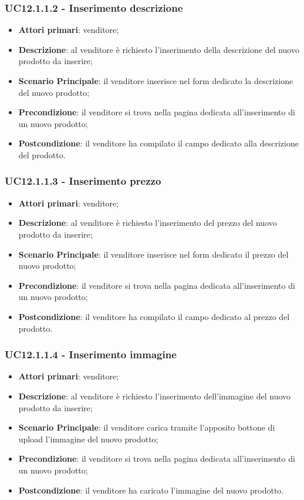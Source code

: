 \subsubsection{UC12.1.1.2 - Inserimento descrizione}
\begin{itemize}
\item \textbf{Attori primari}: venditore;
\item \textbf{Descrizione}: al venditore è richiesto l'inserimento della descrizione del nuovo prodotto da inserire;
\item \textbf{Scenario Principale}: il venditore inserisce nel form dedicato la descrizione del nuovo prodotto;
\item \textbf{Precondizione}: il venditore si trova nella pagina dedicata all'inserimento di un nuovo prodotto;
\item \textbf{Postcondizione}: il venditore ha compilato il campo dedicato alla descrizione del prodotto.
\end{itemize}

\subsubsection{UC12.1.1.3 - Inserimento prezzo}
\begin{itemize}
\item \textbf{Attori primari}: venditore;
\item \textbf{Descrizione}: al venditore è richiesto l'inserimento del prezzo del nuovo prodotto da inserire;
\item \textbf{Scenario Principale}: il venditore inserisce nel form dedicato il prezzo del nuovo prodotto;
\item \textbf{Precondizione}: il venditore si trova nella pagina dedicata all'inserimento di un nuovo prodotto;
\item \textbf{Postcondizione}: il venditore ha compilato il campo dedicato al prezzo del prodotto.
\end{itemize}

\subsubsection{UC12.1.1.4 - Inserimento immagine}
\begin{itemize}
\item \textbf{Attori primari}: venditore;
\item \textbf{Descrizione}: al venditore è richiesto l'inserimento dell'immagine del nuovo prodotto da inserire;
\item \textbf{Scenario Principale}: il venditore carica tramite l'apposito bottone di upload l'immagine del nuovo prodotto;
\item \textbf{Precondizione}: il venditore si trova nella pagina dedicata all'inserimento di un nuovo prodotto;
\item \textbf{Postcondizione}: il venditore ha caricato l'immagine del nuovo prodotto.
\end{itemize}

